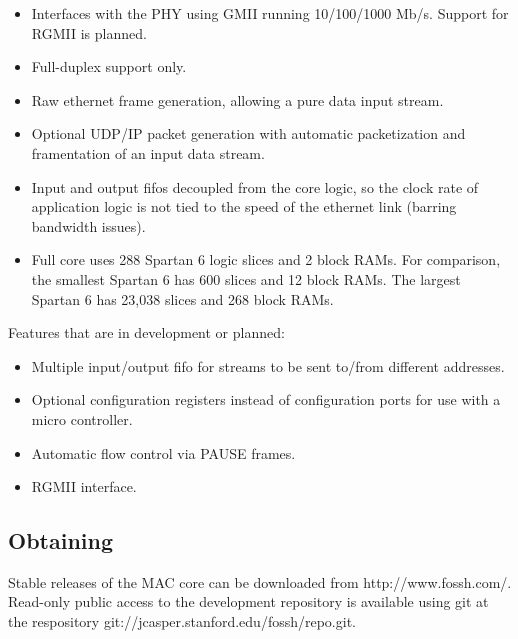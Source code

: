 \documentclass[11pt]{article}
\begin{document}
\begin{itemize}

\item Interfaces with the PHY using GMII running 10/100/1000 Mb/s.
  Support for RGMII is planned.

\item Full-duplex support only.

\item Raw ethernet frame generation, allowing a pure data input stream.

\item Optional UDP/IP packet generation with automatic packetization and
  framentation of an input data stream.

\item Input and output fifos decoupled from the core logic, so the
  clock rate of application logic is not tied to the speed of the
  ethernet link (barring bandwidth issues).

\item Full core uses 288 Spartan 6 logic slices and 2 block RAMs.  For
  comparison, the smallest Spartan 6 has 600 slices and 12 block RAMs.
  The largest Spartan 6 has 23,038 slices and 268 block RAMs.

\end{itemize}

\noindent Features that are in development or planned:

\begin{itemize}


\item Multiple input/output fifo for streams to be sent to/from
  different addresses.

\item Optional configuration registers instead of configuration ports
  for use with a micro controller.

\item Automatic flow control via PAUSE frames.

\item RGMII interface.

\end{itemize}

\subsection{Obtaining}

Stable releases of the MAC core can be downloaded from
http://www.fossh.com/.  Read-only public access to the development
repository is available using git at the respository
git://jcasper.stanford.edu/fossh/repo.git.
\end{document}
